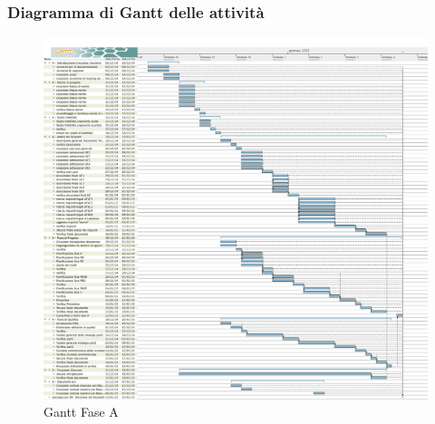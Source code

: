	\subsubsection{Diagramma di Gantt delle attività}
	\begin{figure}\centering
		\includegraphics[width=\textwidth]{PianoDiProgetto/Pics/FaseA.png}
	\caption{Gantt Fase A}
\end{figure}
